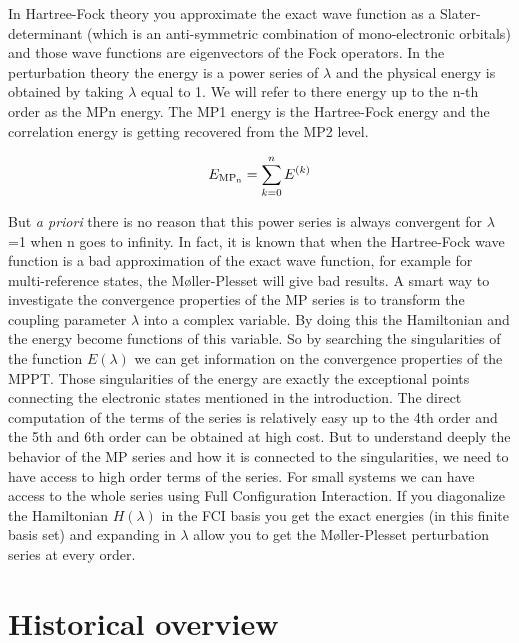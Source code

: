 \documentclass[11pt,a4paper]{article}
\begin{document}
In Hartree-Fock theory you approximate the exact wave function as a Slater-determinant (which is an anti-symmetric combination of mono-electronic orbitals) and those wave functions are eigenvectors of the Fock operators. In the perturbation theory the energy is a power series of $\lambda$ and the physical energy is obtained by taking $\lambda$ equal to 1. We will refer to there energy up to the n-th order as the MPn energy. The MP1 energy is the Hartree-Fock energy and the correlation energy is getting recovered from the MP2 level.

\begin{equation}
E_{\text{MP\textsubscript{n}}}= \sum_{k=0}^n E^{(k)}
\end{equation}

But \textit{a priori} there is no reason that this power series is always convergent for $\lambda$=1 when n goes to infinity. In fact, it is known that when the Hartree-Fock wave function is a bad approximation of the exact wave function, for example for multi-reference states, the M{\o}ller-Plesset will give bad results. A smart way to investigate the convergence properties of the MP series is to transform the coupling parameter $\lambda$ into a complex variable. By doing this the Hamiltonian and the energy become functions of this variable. So by searching the singularities of the function $E(\lambda)$ we can get information on the convergence properties of the MPPT. Those singularities of the energy are exactly the exceptional points connecting the electronic states mentioned in the introduction. The direct computation of the terms of the series is relatively easy up to the 4th order and the 5th and 6th order can be obtained at high cost. But to understand deeply the behavior of the MP series and how it is connected to the singularities, we need to have access to high order terms of the series. For small systems we can have access to the whole series using Full Configuration Interaction. If you diagonalize the Hamiltonian $H(\lambda)$ in the FCI basis you get the exact energies (in this finite basis set) and expanding in $\lambda$ allow you to get the M{\o}ller-Plesset perturbation series at every order.

\section{Historical overview}
\end{document}
